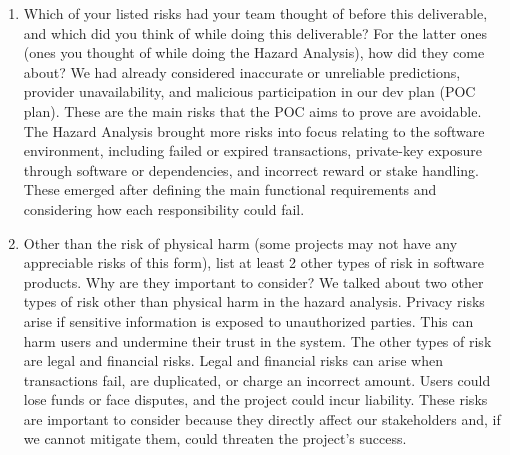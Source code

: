 \documentclass{article}
\begin{document}
\begin{enumerate}
    for every major piece of work and tracking its progress on the Kanban board.
    \item Which of your listed risks had your team thought of before this
    deliverable, and which did you think of while doing this deliverable? For
    the latter ones (ones you thought of while doing the Hazard Analysis), how
    did they come about?
    We had already considered inaccurate or unreliable predictions, provider
    unavailability, and malicious participation in our dev plan (POC plan).
    These are the main risks that the POC aims to prove are avoidable.
    The Hazard Analysis brought more risks into focus relating to the software environment,
    including failed or expired transactions,
    private-key exposure through software or dependencies, and incorrect reward
    or stake handling. These emerged after defining the main functional requirements
    and considering how each responsibility could fail.
    \item Other than the risk of physical harm (some projects may not have any
    appreciable risks of this form), list at least 2 other types of risk in
    software products. Why are they important to consider?
    We talked about two other types of risk other than physical harm in the hazard analysis.
    Privacy risks arise if sensitive
    information is exposed to unauthorized parties. This can harm users and
    undermine their trust in the system. The other types of risk are legal and financial risks.
    Legal and financial risks can arise
    when transactions fail, are duplicated, or charge an incorrect amount.
    Users could lose funds or face disputes, and the project could incur
    liability. These risks are important
    to consider because they directly affect our stakeholders and, if we cannot
    mitigate them, could threaten the project's success.
\end{enumerate}
\end{document}
